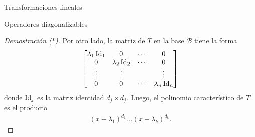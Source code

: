 \begin{chapter}{Transformaciones lineales}
\begin{section}{Operadores diagonalizables}
\begin{proof}[Demostración ($*$)]
            Por otro lado, la matriz de $T$ en la base $\mathcal{B}$ tiene la forma
            \begin{equation*}
                \begin{bmatrix}
                \lambda_1 \operatorname{Id}_1 &0&\cdots&0 \\0&\lambda_2 \operatorname{Id}_2&\cdots&0 \\\vdots&\vdots&&\vdots \\0&0&\cdots&\lambda_n \operatorname{Id}_n 
                \end{bmatrix}
            \end{equation*}
            donde $\operatorname{Id}_j$ es la matriz identidad $d_j \times d_j$. Luego,  el polinomio característico de $T$ es el producto
            \begin{align*}
                (x-\lambda_1)^{d_1}\ldots(x-\lambda_k)^{d_k}.
            \end{align*}
        \end{proof}
    

\end{section}
\end{chapter}
